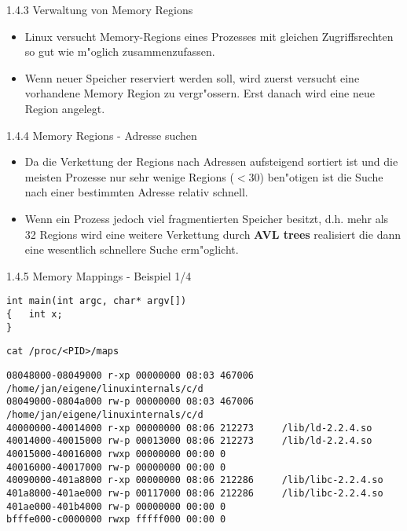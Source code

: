 \documentclass[landscape]{slides}
\begin{document}
%
%
%
\begin{slide}{1.4.3 Verwaltung von Memory Regions}
\begin{itemize}
\item Linux versucht Memory-Regions eines Prozesses mit gleichen Zugriffsrechten so gut wie m"oglich zusammenzufassen.
\item Wenn neuer Speicher reserviert werden soll, wird zuerst versucht eine vorhandene Memory Region zu vergr"ossern. Erst danach wird eine neue Region angelegt.
\end{itemize}
\end{slide}
%
%
\begin{slide}{1.4.4 Memory Regions - Adresse suchen}
\begin{itemize}
\item Da die Verkettung der Regions nach Adressen aufsteigend sortiert ist und die meisten Prozesse nur sehr wenige Regions ($<$30) ben"otigen ist die Suche nach einer bestimmten Adresse relativ schnell.
\item Wenn ein Prozess jedoch viel fragmentierten Speicher besitzt, d.h. mehr als 32 Regions wird eine weitere Verkettung durch \textbf{AVL trees} realisiert die dann eine wesentlich schnellere Suche erm"oglicht.
\end{itemize}
\end{slide}
%
%
%
\begin{slide}{1.4.5 Memory Mappings - Beispiel 1/4}
\small{
\begin{verbatim}
int main(int argc, char* argv[])
{	int x;
}
\end{verbatim}
}
\normalsize{\texttt{cat /proc/<PID>/maps}}
\small{
\begin{verbatim}
08048000-08049000 r-xp 00000000 08:03 467006     /home/jan/eigene/linuxinternals/c/d
08049000-0804a000 rw-p 00000000 08:03 467006     /home/jan/eigene/linuxinternals/c/d
40000000-40014000 r-xp 00000000 08:06 212273     /lib/ld-2.2.4.so
40014000-40015000 rw-p 00013000 08:06 212273     /lib/ld-2.2.4.so
40015000-40016000 rwxp 00000000 00:00 0
40016000-40017000 rw-p 00000000 00:00 0
40090000-401a8000 r-xp 00000000 08:06 212286     /lib/libc-2.2.4.so
401a8000-401ae000 rw-p 00117000 08:06 212286     /lib/libc-2.2.4.so
401ae000-401b4000 rw-p 00000000 00:00 0
bfffe000-c0000000 rwxp fffff000 00:00 0
\end{verbatim}
}
\end{slide}
%
%
%
\end{document}

